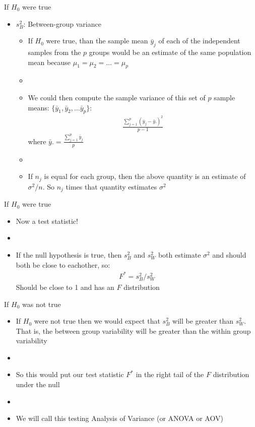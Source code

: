 \documentclass[xcolor=dvipsnames]{beamer}
\begin{document}
\begin{frame}{If $H_0$ were true}
	\begin{itemize}
		\item $s_B^2$: Between-group variance \pause
		\begin{itemize}
			\item If $H_0$ were true, than the sample mean  $\bar{y}_j$ of each of the independent samples from the $p$ groups would be an estimate of the same population mean because $\mu_1 = \mu_2 = \hdots = \mu_p$ \pause
			\item[]
			\item We could then compute the sample variance of this set of $p$ sample means: $\{\bar{y}_1, \bar{y}_2, \hdots \bar{y}_p\}$: \pause
			\begin{gather*}
				\frac{\sum_{j=1}^p (\bar{y}_j - \bar{y}.)^2}{p-1}
			\end{gather*} 
			where $\bar{y}. = \frac{\sum_{j=1}^p \bar{y}_j}{p}$ \pause
			\item[]
			\item If $n_j$ is equal for each group, then the above quantity is an estimate of $\sigma^2 / n$. So $n_j$ times that quantity estimates $\sigma^2$
		\end{itemize}
	\end{itemize}
\end{frame}

\begin{frame}{If $H_0$ were true}
	\begin{itemize}
		\item Now a test statistic! \pause
		\item[]
		\item If the null hypothesis is true, then $s_B^2$ and $s_W^2$ both estimate $\sigma^2$ and should both be close to eachother, so:  \pause
		\begin{gather*}
		F^* = s_B^2 / s_W^2
		\end{gather*}
		Should be close to 1 and has an $F$ distribution
	\end{itemize}
\end{frame}

\begin{frame}{If $H_0$ was not true}
	\begin{itemize}
		\item If $H_0$ were not true then we would expect that $s^2_B$ will be greater than $s_W^2$. That is, the between group variability will be greater than the within group variability \pause
		\item[]
		\item So this would put our test statistic $F^*$ in the right tail of the $F$ distribution under the null \pause
		\item[]
		\item We will call this testing Analysis of Variance (or ANOVA or AOV)
	\end{itemize}
\end{frame}
\end{document}
